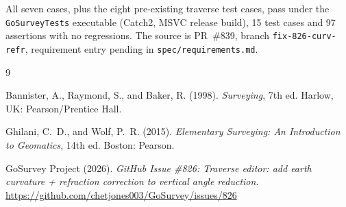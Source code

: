 \documentclass[11pt]{article}
\begin{document}
All seven cases, plus the eight pre-existing traverse test cases, pass
under the \texttt{GoSurveyTests} executable (Catch2, MSVC release build),
15 test cases and 97 assertions with no regressions. The source is
PR~\#839, branch \texttt{fix-826-curv-refr}, requirement entry pending in
\texttt{spec/requirements.md}.

\begin{thebibliography}{9}

Bannister, A., Raymond, S., and Baker, R. (1998). \emph{Surveying}, 7th
ed. Harlow, UK: Pearson/Prentice Hall.

Ghilani, C.~D., and Wolf, P.~R. (2015). \emph{Elementary Surveying: An
Introduction to Geomatics}, 14th ed. Boston: Pearson.

GoSurvey Project (2026). \emph{GitHub Issue \#826: Traverse editor: add
earth curvature + refraction correction to vertical angle reduction}.
\url{https://github.com/chetjones003/GoSurvey/issues/826}

\end{thebibliography}
\end{document}
